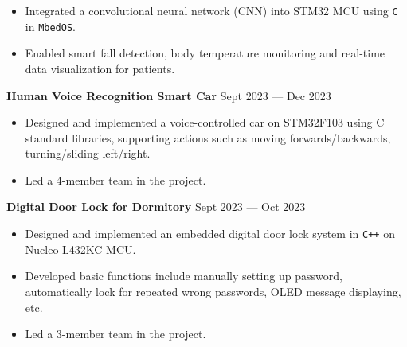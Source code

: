 \documentclass[a4paper,11pt]{article}
\begin{document}
\begin{itemize}
    \setlength\itemsep{-0.5em}
    \item Integrated a convolutional neural network (CNN) into STM32 MCU using \texttt{C} in \texttt{MbedOS}.
    \item Enabled smart fall detection, body temperature monitoring and real-time data visualization for patients.
\end{itemize}





\textbf{Human Voice Recognition Smart Car} \hfill Sept 2023 --- Dec 2023

\begin{itemize}
    \setlength\itemsep{-0.5em}
    \item Designed and implemented a voice-controlled car on STM32F103 using C standard libraries, supporting actions such as moving forwards/backwards, turning/sliding left/right.
    \item Led a 4-member team in the project.
\end{itemize}

\textbf{Digital Door Lock for Dormitory} \hfill Sept 2023 --- Oct 2023

\begin{itemize}
    \setlength\itemsep{-0.5em}
    \item Designed and implemented an embedded digital door lock system in \texttt{C++} on Nucleo L432KC MCU. 
    \item Developed basic functions include manually setting up password, automatically lock for repeated wrong passwords, OLED message displaying, etc.
    \item Led a 3-member team in the project.
\end{itemize}



\end{document}
